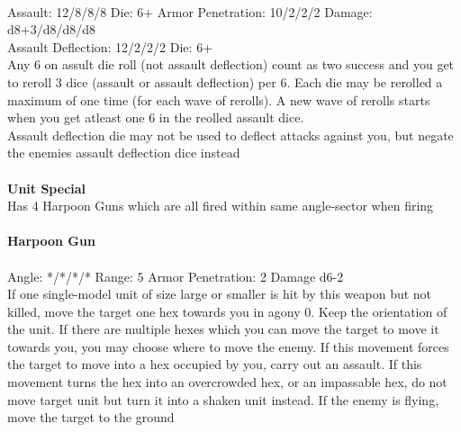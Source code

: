 \ \\
Assault: 12/8/8/8 Die: 6+ Armor Penetration: 10/2/2/2 Damage: d8+3/d8/d8/d8 \\
Assault Deflection: 12/2/2/2 Die: 6+\\
\indent Any 6 on assult die roll (not assault deflection) count as two success and you get to reroll 3 dice (assault or assault deflection) per 6. Each die may be rerolled a maximum of one time (for each wave of rerolls). A new wave of rerolls starts when you get atleast one 6 in the reolled assault dice.\\ Assault deflection die may not be used to deflect attacks against you, but negate the enemies assault deflection dice instead \\
\ \\

{\bf Unit Special} \\
Has 4 Harpoon Guns which are all fired within same angle-sector when firing
\ \\
\ \\
{\bf Harpoon Gun } \\
\ \\
Angle: */*/*/* Range: 5 Armor Penetration: 2 Damage d6-2 \\
\indent If one single-model unit of size large or smaller is hit by this weapon but not killed, move the target one hex towards you in agony 0. Keep the orientation of the unit. If there are multiple hexes which you can move the target to move it towards you, you may choose where to move the enemy. If this movement forces the target to move into a hex occupied by you, carry out an assault. If this movement turns the hex into an overcrowded hex, or an impassable hex, do not move target unit but turn it into a shaken unit instead. If the enemy is flying, move the target to the ground \\





